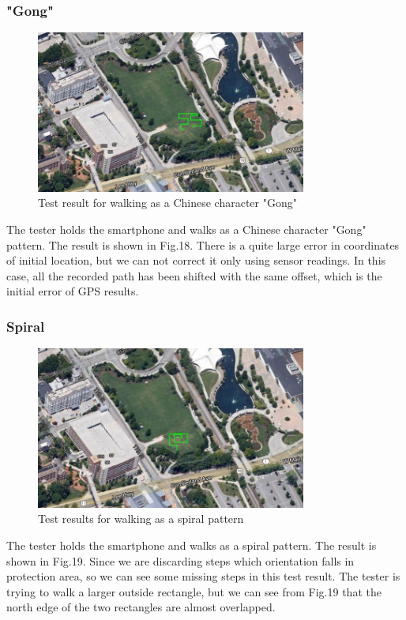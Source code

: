 \documentclass[journal]{IEEEtran}
\begin{document}
\subsubsection{"Gong"}
\begin{figure}
	\centering
	\includegraphics[width=3.5in]{figures/2-gong}
	\caption{Test result for walking as a Chinese character "Gong"}
\end{figure}

The tester holds the smartphone and walks as a Chinese character "Gong" pattern.
The result is shown in Fig.18.
There is a quite large error in coordinates of initial location, but we can not correct it only using sensor readings.
In this case, all the recorded path has been shifted with the same offset, which is the initial error of GPS results.

\subsubsection{Spiral}
\begin{figure}
	\centering
	\includegraphics[width=3.5in]{figures/3-circle}
	\caption{Test results for walking as a spiral pattern}
\end{figure}

The tester holds the smartphone and walks as a spiral pattern.
The result is shown in Fig.19.
Since we are discarding steps which orientation falls in protection area, so we can see some missing steps in this test result.
The tester is trying to walk a larger outside rectangle, but we can see from Fig.19 that the north edge of the two rectangles are almost overlapped.
\end{document}
